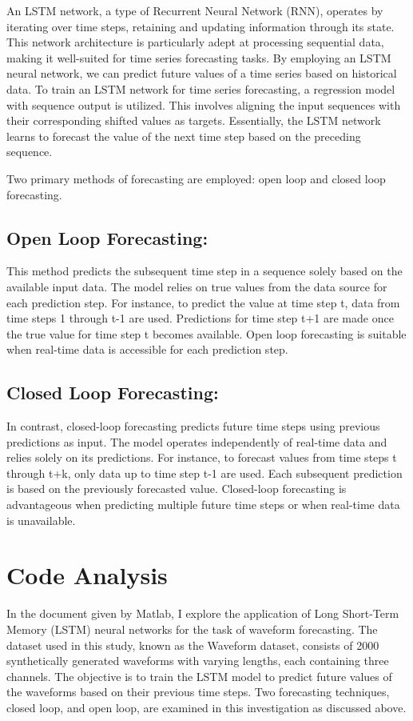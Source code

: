 \documentclass{article}
\begin{document}
An LSTM network, a type of Recurrent Neural Network (RNN), operates by iterating over time steps, retaining and updating information through its state. This network architecture is particularly adept at processing sequential data, making it well-suited for time series forecasting tasks. By employing an LSTM neural network, we can predict future values of a time series based on historical data. To train an LSTM network for time series forecasting, a regression model with sequence output is utilized. This involves aligning the input sequences with their corresponding shifted values as targets. Essentially, the LSTM network learns to forecast the value of the next time step based on the preceding sequence.

Two primary methods of forecasting are employed: 
open loop and closed loop forecasting.

\subsection{Open Loop Forecasting:} This method predicts the subsequent time step in a sequence solely based on the available input data. The model relies on true values from the data source for each prediction step. For instance, to predict the value at time step t, data from time steps 1 through t-1 are used. Predictions for time step t+1 are made once the true value for time step t becomes available. Open loop forecasting is suitable when real-time data is accessible for each prediction step.
\subsection{Closed Loop Forecasting:} In contrast, closed-loop forecasting predicts future time steps using previous predictions as input. The model operates independently of real-time data and relies solely on its predictions. For instance, to forecast values from time steps t through t+k, only data up to time step t-1 are used. Each subsequent prediction is based on the previously forecasted value. Closed-loop forecasting is advantageous when predicting multiple future time steps or when real-time data is unavailable.

\section{Code Analysis}
In the document given by Matlab, I explore the application of Long Short-Term Memory (LSTM) neural networks for the task of waveform forecasting. The dataset used in this study, known as the Waveform dataset, consists of 2000 synthetically generated waveforms with varying lengths, each containing three channels. The objective is to train the LSTM model to predict future values of the waveforms based on their previous time steps. Two forecasting techniques, closed loop, and open loop, are examined in this investigation as discussed above.
\end{document}
